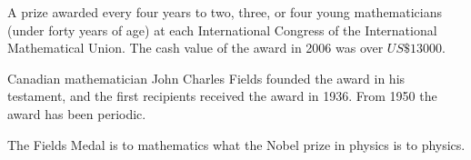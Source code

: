 \documentclass[12pt]{article}
\begin{document}
A prize awarded every four years to two, three, or four young mathematicians (under forty years of age) at each International Congress of the International Mathematical Union. The cash value of the award in 2006 was over $US\$13000$.

Canadian mathematician John Charles Fields founded the award in his testament, and the first recipients received the award in 1936. From 1950 the award has been periodic.

The Fields Medal is to mathematics what the Nobel prize in physics is to physics.
\end{document}
